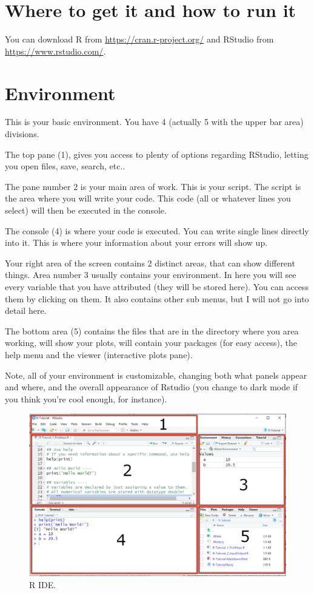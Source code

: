 \documentclass[
]{book}
\begin{document}
\hypertarget{where-to-get-it-and-how-to-run-it}{%
\section{Where to get it and how to run it}\label{where-to-get-it-and-how-to-run-it}}

You can download R from \url{https://cran.r-project.org/} and RStudio from \url{https://www.rstudio.com/}.

\hypertarget{environment}{%
\section{Environment}\label{environment}}

This is your basic environment.
You have 4 (actually 5 with the upper bar area) divisions.

The top pane (1), gives you access to plenty of options regarding RStudio, letting you open files, save, search, etc..

The pane number 2 is your main area of work.
This is your script.
The script is the area where you will write your code.
This code (all or whatever lines you select) will then be executed in the console.

The console (4) is where your code is executed.
You can write single lines directly into it.
This is where your information about your errors will show up.

Your right area of the screen contains 2 distinct areas, that can show different things.
Area number 3 usually contains your environment.
In here you will see every variable that you have attributed (they will be stored here).
You can access them by clicking on them.
It also contains other sub menus, but I will not go into detail here.

The bottom area (5) contains the files that are in the directory where you area working, will show your plots, will contain your packages (for easy access), the help menu and the viewer (interactive plots pane).

Note, all of your environment is customizable, changing both what panels appear and where, and the overall appearance of Rstudio (you change to dark mode if you think you're cool enough, for instance).

\begin{figure}
\centering
\includegraphics{images/rstudio_ide.png}
\caption{R IDE.}
\end{figure}
\end{document}

